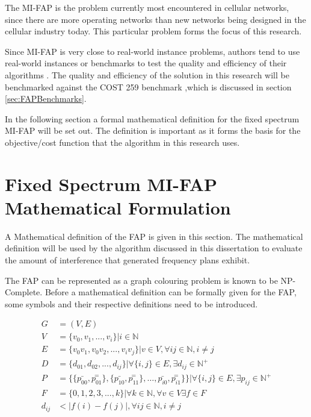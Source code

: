 The MI-FAP is the problem currently most encountered in cellular networks, since there are more operating networks than new networks being designed in the cellular industry today. This particular problem forms the focus of this research. 

Since MI-FAP is very close to real-world instance problems, authors tend to use real-world instances or benchmarks to test the quality and efficiency of their algorithms \cite{Karen2004,Eisenblatter,MontemanniThesis,MultipleBinaryFAP}. The quality and efficiency of the solution in this research will be benchmarked against the COST 259 benchmark ,which is discussed in section \ref{sec:FAPBenchmarks}.

In the following section a formal mathematical definition for the fixed spectrum MI-FAP will be set out. The definition is important as it forms the basis for the objective/cost function that the algorithm in this research uses.
\section{Fixed Spectrum MI-FAP Mathematical Formulation}
\label{sec:FAPMathDef}
A Mathematical definition of the FAP is given in this section. The mathematical definition will be used by the algorithm discussed in this dissertation to evaluate the amount of interference that generated frequency plans exhibit.

The FAP can be represented as a graph colouring problem is known to be NP-Complete. Before a mathematical definition can be formally given for the FAP, some symbols and their respective definitions need to be introduced.

\begin{align}
	G &= (V,E) \label{E:setG}\\
	V &= \{v_{0},v_{1},...,v_{i}\} | i \in \mathbb{N} \label{E:setV}\\
	E &= \{v_0v_1,v_0v_2,...,v_iv_j\}|v \in V,\forall ij \in \mathbb{N},i \neq j \label{E:setE}\\
	D &= \{d_{01},d_{02},...,d_{ij}\}| \forall\{i,j\} \in E, \exists d_{ij} \in \mathbb{N}^+ \label{E:setD}\\
	P &= \{\{\bar{p_{00}},\overset{=}{p_{01}}\},\{\bar{p_{10}},\overset{=}{p_{11}}\},\ldots,\bar{p_{i0}},\overset{=}{p_{i1}}\}\}| \forall \{i,j\} \in E,\exists p_{ij} \in \mathbb{N}^+ \label{E:setP}\\
	F &= \{0,1,2,3,...,k\}| \forall k \in \mathbb{N},\forall v \in V \exists f \in F\label{E:setF}\\
	d_{ij} &< |f(i) - f(j)|, \forall ij \in \mathbb{N},i \neq j \label{E:interference}
\end{align}


